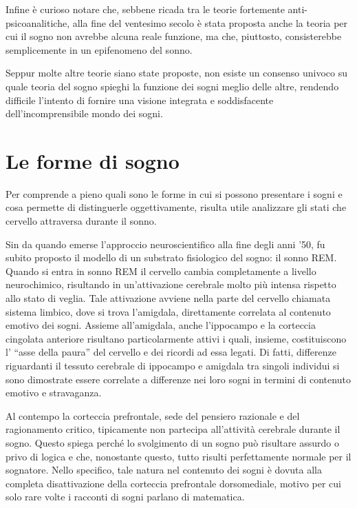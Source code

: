 Infine è curioso notare che, sebbene ricada tra le teorie fortemente anti-psicoanalitiche, alla fine del
ventesimo secolo è stata proposta anche la teoria per cui il sogno non avrebbe alcuna reale funzione, ma che,
piuttosto, consisterebbe semplicemente in un epifenomeno del sonno.

Seppur molte altre teorie siano state proposte, non esiste un consenso univoco su quale teoria del sogno
spieghi la funzione dei sogni meglio delle altre, rendendo difficile l'intento di fornire una visione integrata e
soddisfacente dell'incomprensibile mondo dei sogni.

\section{Le forme di sogno}

Per comprende a pieno quali sono le forme in cui si possono presentare i sogni e cosa permette di distinguerle
oggettivamente, risulta utile analizzare gli stati che cervello attraversa durante il sonno.

Sin da quando emerse l'approccio neuroscientifico alla fine degli anni '50, fu subito proposto il modello di un
substrato fisiologico del sogno: il sonno REM.
Quando si entra in sonno REM il cervello cambia completamente a livello neurochimico, risultando in un'attivazione
cerebrale molto più intensa rispetto allo stato di veglia.
Tale attivazione avviene nella parte del cervello chiamata sistema limbico, dove si trova
l'amigdala, direttamente correlata al contenuto emotivo dei sogni.
Assieme all'amigdala, anche l'ippocampo e la corteccia cingolata anteriore risultano particolarmente attivi
i quali, insieme, costituiscono l' ``asse della paura'' del cervello e dei ricordi ad essa legati.
Di fatti, differenze riguardanti il tessuto cerebrale di ippocampo e amigdala tra singoli individui si sono dimostrate
essere correlate a differenze nei loro sogni in termini di contenuto emotivo e stravaganza.

Al contempo la corteccia prefrontale, sede del pensiero razionale e del ragionamento critico, tipicamente non
partecipa all'attività cerebrale durante il sogno.
Questo spiega perché lo svolgimento di un sogno può risultare assurdo o privo di logica e che, nonostante questo,
tutto risulti perfettamente normale per il sognatore.
Nello specifico, tale natura nel contenuto dei sogni è dovuta alla completa disattivazione della
corteccia prefrontale dorsomediale, motivo per cui solo rare volte i racconti di sogni parlano di matematica.


